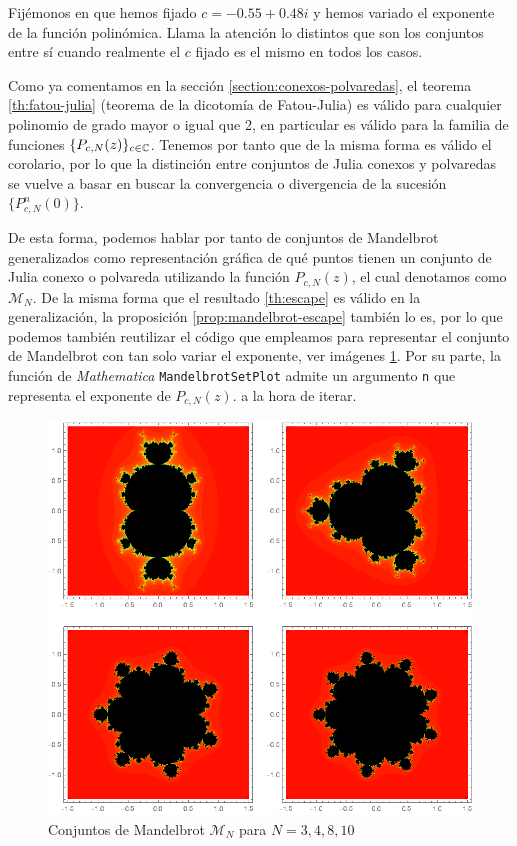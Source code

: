 Fijémonos en que hemos fijado $c=-0.55+0.48i$ y hemos variado el exponente de la función polinómica. Llama la atención lo distintos que son los conjuntos entre sí cuando realmente el $c$ fijado es el mismo en todos los casos. 

\newpage

Como ya comentamos en la sección \ref{section:conexos-polvaredas}, el teorema \ref{th:fatou-julia} (teorema de la dicotomía de Fatou-Julia) es válido para cualquier polinomio de grado mayor o igual que 2, en particular es válido para la familia de funciones $\{P_{c,N}(z)\}_{c\in\mathbb{C}}$. Tenemos por tanto que de la misma forma es válido el corolario, por lo que la distinción entre conjuntos de Julia conexos y polvaredas se vuelve a basar en buscar la convergencia o divergencia de la sucesión $\{P_{c,N}^n(0)\}$.

De esta forma, podemos hablar por tanto de conjuntos de Mandelbrot generalizados como representación gráfica de qué puntos tienen un conjunto de Julia conexo o polvareda utilizando la función $P_{c,N}(z)$, el cual denotamos como $\mathcal{M}_N$. De la misma forma que el resultado \ref{th:escape} es válido en la generalización, la proposición \ref{prop:mandelbrot-escape} también lo es, por lo que podemos también reutilizar el código que empleamos para representar el conjunto de Mandelbrot con tan solo variar el exponente, ver imágenes \ref{fig:mandelbrot-generalizados}. Por su parte, la función de \textit{Mathematica} \verb|MandelbrotSetPlot| admite un argumento \verb|n| que representa el exponente de $P_{c,N}(z).$ a la hora de iterar.

\begin{figure}[ht]
  \centering
  \includegraphics[scale=0.7]{./img/C3/mandelbrot-generalizado.png}
  \caption{Conjuntos de Mandelbrot $\mathcal{M}_N$ para $N=3,4,8,10$}
  \label{fig:mandelbrot-generalizados}
\end{figure}

